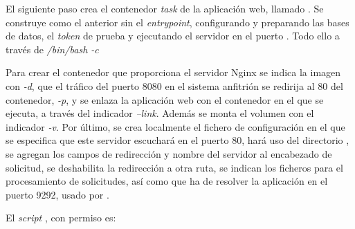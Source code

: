 El siguiente paso crea el contenedor \textit{task} de la aplicación web, llamado . Se construye como el anterior sin el \textit{entrypoint}, configurando y preparando las bases de datos, el \textit{token} de prueba y ejecutando el servidor  en el puerto . Todo ello a través de \textit{/bin/bash \--c}

Para crear el contenedor  que proporciona el servidor Nginx se indica la imagen con \textit{\--d}, que el tráfico del puerto 8080 en el sistema anfitrión se redirija al 80 del contenedor, \textit{\--p}, y se enlaza la aplicación web con el contenedor en el que se ejecuta, a través del indicador \textit{\---link}. Además se monta el volumen  con el indicador \textit{\--v}. Por último, se crea localmente el fichero de configuración  en el que se especifica que este servidor escuchará en el puerto 80, hará uso del directorio , se agregan los campos de redirección y nombre del servidor al encabezado de solicitud, se deshabilita la redirección a otra ruta, se indican los ficheros para el procesamiento de solicitudes, así como que ha de resolver la aplicación en el puerto 9292, usado por .  

\begin{codelisting}
\label{code:nginxconf}
\end{codelisting}

El \textit{script} , con permiso  es:

